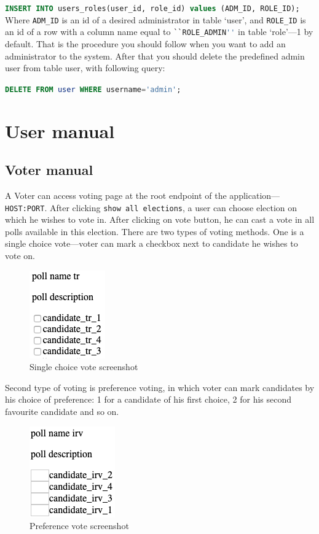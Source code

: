 \documentclass[a4paper,twoside,12pt]{book}
\begin{document}
    \lstinline[language=sql]|INSERT INTO users_roles(user_id, role_id) values (ADM_ID, ROLE_ID);|
    Where \lstinline[language=sql]|ADM_ID| is an id of a desired administrator in table `user', and \lstinline[language=sql]|ROLE_ID| is an id of a row with a column name equal to \lstinline[language=sql]|``ROLE_ADMIN''| in table `role'---1 by default.
    That is the procedure you should follow when you want to add an administrator to the system.
    After that you should delete the predefined admin user from table user, with following query:

    \lstinline[language=sql]|DELETE FROM user WHERE username='admin';|

  \section{User manual}
    \subsection{Voter manual}
      A Voter can access voting page at the root endpoint of the application---\mbox{\lstinline|HOST:PORT|.}
      After clicking \lstinline|show all elections|, a user can choose election on which he wishes to vote in.
      After clicking on vote button, he can cast a vote in all polls available in this election.
      \pagebreak
      There are two types of voting methods. One is a single choice vote---voter can mark a checkbox next to candidate he wishes to vote on.
      \begin{figure}[h]
        \centering
        \includegraphics[width=0.3\linewidth]{single_choice_vote_screenshot.png}
        \caption{Single choice vote screenshot}
        \label{fig:single_choice_vote_screenshot}
      \end{figure}

      Second type of voting is preference voting, in which voter can mark candidates by his choice of preference:
      1 for a candidate of his first choice, 2 for his second favourite candidate and so on.
      \begin{figure}[h]
        \centering
        \includegraphics[width=0.3\linewidth]{preference_vote_screenshot.png}
        \caption{Preference vote screenshot}
        \label{fig:preference_vote_screenshot}
      \end{figure}
\end{document}
